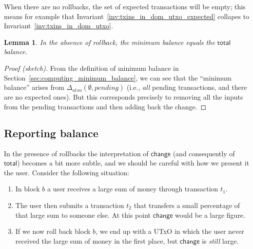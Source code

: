 \documentclass{article}
\newtheorem{lemma}{Lemma}
\begin{document}
When there are no rollbacks, the set of expected transactions will be empty;
this means for example that Invariant~\ref{inv:txins_in_dom_utxo_expected}
collapes to Invariant~\ref{inv:txins_in_dom_utxo}.


\begin{lemma}
In the absence of rollback, the minimum balance equals the $\mathsf{total}$
balance.
\end{lemma}

\begin{proof}[Proof (sketch)]
From the definition of minimum balance in
Section~\ref{sec:computing_minimum_balance}, we can see that the ``minimum
balance'' arises from $\Delta_\mathit{utxo} (\emptyset, \mathit{pending})$
(i.e., \emph{all} pending transactions, and there are no expected ones).
But this corresponds precisely to removing all the inputs from the pending
transactions and then adding back the change.
\end{proof}


\subsection{Reporting balance}
\label{sec:reporting}

In the presence of rollbacks the interpretation of $\mathsf{change}$ (and
consequently of $\mathsf{total}$) becomes a bit more subtle, and we should be
careful with how we present it the user. Consider the following situation:
%
\begin{enumerate}
\item In block $b$ a user receives a large sum of money through transaction
$t_1$.
\item The user then submits a transaction $t_2$ that transfers a small
percentage of that large sum to someone else. At this point $\mathsf{change}$
would be a large figure.
\item If we now roll back block $b$, we end up with a UTxO in
which the user never received the large sum of money in the first place, but
$\mathsf{change}$ is \emph{still} large.
\end{enumerate}
\end{document}
